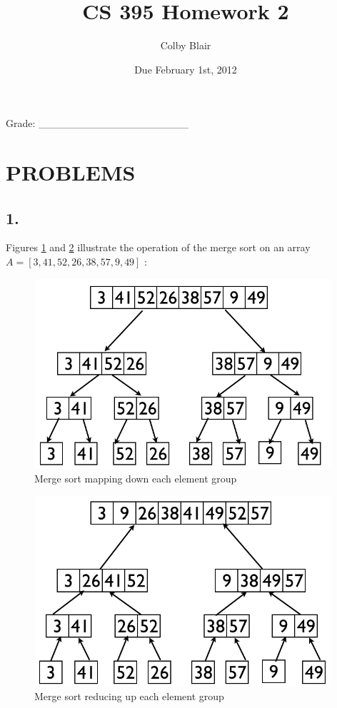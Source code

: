 \documentclass[11pt,letterpaper]{article}
\date{Due February 1st, 2012}
\title{CS 395 Homework 2}
\author{Colby Blair}
\begin{document}
\maketitle

\begin{center}

Grade: \_\_\_\_\_\_\_\_\_\_\_\_\_\_\_\_\_\_\_\_
\end{center}

\thispagestyle{empty}

\pagebreak

\section*{PROBLEMS}

\subsection*{1.}
Figures \ref{merge_map} and \ref{merge_reduce} illustrate the operation of the merge sort on an array 
$ A = [3,41,52,26,38,57,9,49] $ :

\begin{figure}[!h]
        \begin{center}
                \includegraphics[width=110mm]{images/merge_map}
                \caption{Merge sort mapping down each element group}
                \label{merge_map}
        \end{center}
\end{figure}  

\begin{figure}[!h]
        \begin{center}
                \includegraphics[width=110mm]{images/merge_reduce}
                \caption{Merge sort reducing up each element group}
                \label{merge_reduce}
        \end{center}
\end{figure} 
\end{document}
